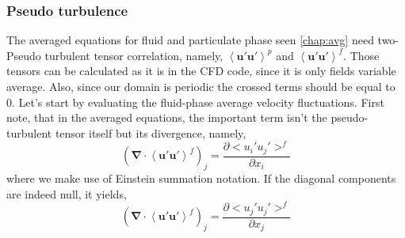\subsubsection{Pseudo turbulence}
The averaged equations for fluid and particulate phase seen \ref{chap:avg} need two-Pseudo turbulent tensor correlation,
namely, $\left<\bm{u'u'}\right>^p$ and $\left<\bm{u'u'}\right>^f$. 
Those tensors can be calculated as it is in the CFD code, since it is only fields variable average. 
Also, since our domain is periodic the crossed terms should be equal to 0.
Let's start by evaluating the fluid-phase average velocity fluctuations.
First note, that in the averaged equations, the important term isn't the pseudo-turbulent tensor itself but its divergence, namely,
\begin{equation*}    
    \left(\bm{\nabla} \cdot \left<\bm{u}'\bm{u}'\right>^f \right)_j = \frac{\partial <u_i' u_j'>^f}{\partial x_i}
\end{equation*}
where we make use of Einstein summation notation.
If the diagonal components are indeed null, it yields,
\begin{equation*}    
    \left(\bm{\nabla} \cdot \left<\bm{u}'\bm{u}'\right>^f \right)_j 
    = \frac{\partial <u_j' u_j'>^f}{\partial x_j}
\end{equation*}
